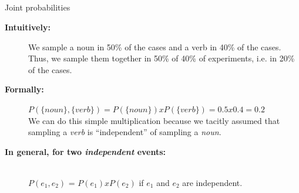 \documentclass[9pt,xcolor=pdftex,dvipsnames,table]{beamer}
\begin{document}
\subsection{}
\begin{frame}{Joint probabilities}

     \begin{description}
          \item[\textbf{Intuitively:}] We sample a noun in 50\% of the cases and a verb in 40\% of the cases.  Thus, we sample them together in 50\% of 40\% of experiments, i.e. in 20\% of the cases.

          \item[\textbf{Formally:}] $P(\{noun\}, \{verb\}) = P(\{noun\}) x P(\{verb\}) = 0.5 x 0.4 = 0.2$\\
          We can do this simple multiplication because we tacitly assumed that
sampling a \emph{verb} is ``independent'' of sampling a \emph{noun}.

          \item[\textbf{In general, for two \emph{independent} events:}]\hspace{.5cm}\\
          $P(e_1, e_2)$ = $P(e_1) x P(e_2)$ if $e_1$ and $e_2$ are independent.
     \end{description}
\end{frame}
\end{document}
